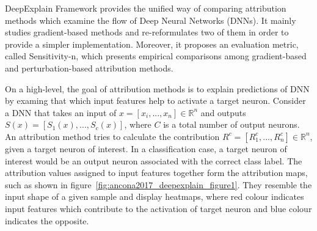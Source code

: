 \documentclass[english]{tktltiki2}
\theoremstyle{definition}
\theoremstyle{remark}
\begin{document}
DeepExplain Framework \citep{ancona2017towards} provides the unified way of comparing attribution methods which examine the flow of Deep Neural Networks (DNNs). It mainly studies gradient-based methods \citep{simonyan2013deep, shrikumar2016not, bach2015pixel, sundararajan2017axiomatic, shrikumar2017learning} and re-reformulates two of them \citep{bach2015pixel, shrikumar2017learning} in order to provide a simpler implementation. Moreover, it proposes an evaluation metric, called Sensitivity-n, which presents empirical comparisons among gradient-based and perturbation-based \citep{zeiler2014visualizing} attribution methods. 




On a high-level, the goal of attribution methods is to explain predictions of DNN by examing that which input features help to activate a target neuron. Consider a DNN that takes an input of $x = [x_i, ..., x_n] \in \mathbb{R}^n$ and outputs $S(x) = \left[S_{1}(x), ..., S_{c}(x)\right]$, where $C$ is a total number of output neurons. An attribution method tries to calculate the contribution $R^c = \left[R_{1}^c, ..., R_{n}^c\right] \in \mathbb{R}^n$, given a target neuron of interest. In a classification case, a target neuron of interest would be an output neuron associated with the correct class label. The attribution values assigned to input features together form the attribution maps, such as shown in figure~\ref{fig:ancona2017_deepexplain_figure1}. They resemble the input shape of a given sample and display heatmaps, where red colour indicates input features which contribute to the activation of target neuron and blue colour indicates the opposite.
\end{document}
